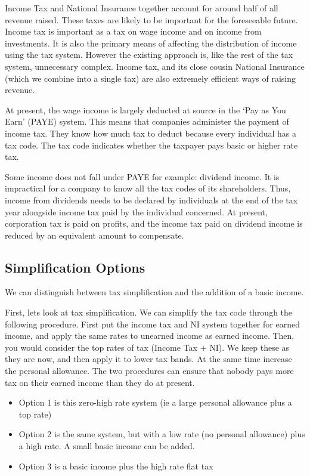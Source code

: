 \documentclass[]{tufte-handout}
\providecommand{\tightlist}{%
  \setlength{\itemsep}{0pt}\setlength{\parskip}{0pt}}
\begin{document}
Income Tax and National Insurance together account for around half of
all revenue raised. These taxes are likely to be important for the
foreseeable future. Income tax is important as a tax on wage income and
on income from investments. It is also the primary means of affecting
the distribution of income using the tax system. However the existing
approach is, like the rest of the tax system, unnecessary complex.
Income tax, and its close cousin National Insurance (which we combine
into a single tax) are also extremely efficient ways of raising revenue.

At present, the wage income is largely deducted at source in the `Pay as
You Earn' (PAYE) system. This means that companies administer the
payment of income tax. They know how much tax to deduct because every
individual has a tax code. The tax code indicates whether the taxpayer
pays basic or higher rate tax.

Some income does not fall under PAYE for example: dividend income. It is
impractical for a company to know all the tax codes of its shareholders.
Thus, income from dividends needs to be declared by individuals at the
end of the tax year alongside income tax paid by the individual
concerned. At present, corporation tax is paid on profits, and the
income tax paid on dividend income is reduced by an equivalent amount to
compensate.

\hypertarget{simplification-options}{%
\subsection{Simplification Options}\label{simplification-options}}

We can distinguish between tax simplification and the addition of a
basic income.

First, lets look at tax simplification. We can simplify the tax code
through the following procedure. First put the income tax and NI system
together for earned income, and apply the same rates to unearned income
as earned income. Then, you would consider the top rates of tax (Income
Tax + NI). We keep these as they are now, and then apply it to lower tax
bands. At the same time increase the personal allowance. The two
procedures can ensure that nobody pays more tax on their earned income
than they do at present.

\begin{itemize}
\tightlist
\item
  Option 1 is this zero-high rate system (ie a large personal allowance
  plus a top rate)
\item
  Option 2 is the same system, but with a low rate (no personal
  allowance) plus a high rate. A small basic income can be added.
\item
  Option 3 is a basic income plus the high rate flat tax
\end{itemize}
\end{document}
